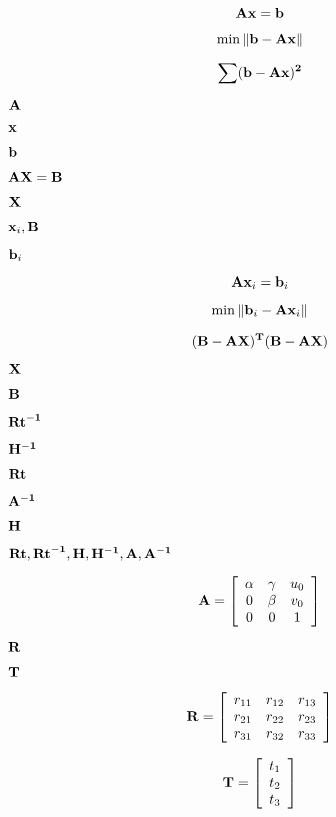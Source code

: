 \documentclass{article}
\begin{document}
{{{\[ \bf{A} \bf{x} = \bf{b} \]
\pagebreak

\[ \min \| \bf{b} - \bf{A}\bf{x} \| \]
\pagebreak

\[ \sum (\bf{b} - \bf{A}\bf{x})^2 \]
\pagebreak

$\bf{A}$
\pagebreak

$\bf{x}$
\pagebreak

$\bf{b}$
\pagebreak

$ \bf{A}\bf{X} = \bf{B} $
\pagebreak

$ \bf{X} $
\pagebreak

$ {\bf x}_i, \bf{B} $
\pagebreak

$ {\bf b}_i $
\pagebreak

\[ {\bf A} {\bf x}_i = {\bf b}_i \]
\pagebreak

\[ \min \| {\bf b}_i - {\bf A} {\bf x}_i \| \]
\pagebreak

\[ (\bf{B} - \bf{A}\bf{X})^T (\bf{B} - \bf{A}\bf{X}) \]
\pagebreak

$\bf{X}$
\pagebreak

$\bf{B}$
\pagebreak

$\bf{Rt}^{-1}$
\pagebreak

$\bf{H}^{-1}$
\pagebreak

$\bf{Rt}$
\pagebreak

$\bf{A}^{-1}$
\pagebreak

$\bf{H}$
\pagebreak

$\bf{Rt}, \bf{Rt}^{-1}, \bf{H}, \bf{H}^{-1}, \bf{A}, \bf{A}^{-1}$
\pagebreak

\[ \bf{A} = \left[ \begin{array}{ccc} \alpha & \gamma & u_0 \\ 0 & \beta & v_0 \\ 0 & 0 & 1 \\ \end{array} \right] \]
\pagebreak

$\bf{R}$
\pagebreak

$\bf{T}$
\pagebreak

\[ \bf{R} = \left[ \begin{array}{ccc} r_{11} & r_{12} & r_{13}\\ r_{21} & r_{22} & r_{23}\\ r_{31} & r_{32} & r_{33} \end{array} \right] \]
\pagebreak

\[ \bf{T} = \left[ \begin{array}{c} t_1 \\ t_2 \\ t_3 \end{array} \right] \]
\pagebreak

}}}
\end{document}
